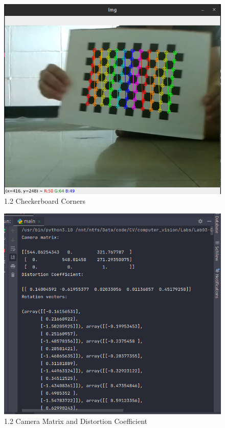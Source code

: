 \documentclass[a4paper, 12pt]{article}
\begin{document}
	\begin{figure}
		\caption{1.2 Checkerboard Corners}
		\includegraphics[scale=0.6]{images/checkerboard_corners.png}
	\end{figure}

	\begin{figure}
		\caption{1.2 Camera Matrix and Distortion Coefficient}
		\includegraphics[scale=0.6]{images/cam_mtx_dist_coe.png}
	\end{figure}
	
\end{document}
